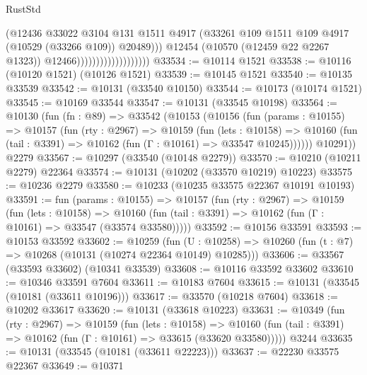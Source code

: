 \begin{lexlean}{RustStd}
\begin{coremodule}
                                            (@12436
                                              @33022
                                              @3104
                                              @131
                                              @1511
                                              @4917
                                              (@33261
                                                @109
                                                @1511
                                                @109
                                                @4917
                                                (@10529 (@33266 @109))
                                                @20489)))
                                          @12454
                                          (@10570 (@12459 @22 @2267 @1323))
                                          @12466)))))))))))))))))))
@33534 := @10114 @1521
@33538 := @10116 (@10120 @1521) (@10126 @1521)
@33539 := @10145 @1521
@33540 := @10135 @33539
@33542 := @10131 (@33540 @10150)
@33544 := @10173 (@10174 @1521)
@33545 := @10169 @33544
@33547 := @10131 (@33545 @10198)
@33564 := @10130
    (fun (fn : @89) =>
    @33542
      (@10153
        (@10156
          (fun (params : @10155) =>
          @10157
            (fun (rty : @2967) =>
            @10159
              (fun (lets : @10158) =>
              @10160 (fun (tail : @3391) => @10162 (fun (Γ : @10161) => @33547 @10245))))))
        @10291))
    @2279
@33567 := @10297 (@33540 (@10148 @2279))
@33570 := @10210 (@10211 @2279) @22364
@33574 := @10131 (@10202 (@33570 @10219) @10223)
@33575 := @10236 @2279
@33580 := @10233 (@10235 @33575 @22367 @10191 @10193)
@33591 := fun (params : @10155) =>
  @10157
    (fun (rty : @2967) =>
    @10159
      (fun (lets : @10158) =>
      @10160 (fun (tail : @3391) => @10162 (fun (Γ : @10161) => @33547 (@33574 @33580)))))
@33592 := @10156 @33591
@33593 := @10153 @33592
@33602 := @10259
    (fun (U : @10258) => @10260 (fun (t : @7) => @10268 (@10131 (@10274 @22364 @10149) @10285)))
@33606 := @33567 (@33593 @33602) (@10341 @33539)
@33608 := @10116 @33592 @33602
@33610 := @10346 @33591 @7604
@33611 := @10183 @7604
@33615 := @10131 (@33545 (@10181 (@33611 @10196)))
@33617 := @33570 (@10218 @7604)
@33618 := @10202 @33617
@33620 := @10131 (@33618 @10223)
@33631 := @10349
    (fun (rty : @2967) =>
    @10159
      (fun (lets : @10158) =>
      @10160 (fun (tail : @3391) => @10162 (fun (Γ : @10161) => @33615 (@33620 @33580)))))
    @3244
@33635 := @10131 (@33545 (@10181 (@33611 @22223)))
@33637 := @22230 @33575 @22367
@33649 := @10371

\end{coremodule}
\end{lexlean}
